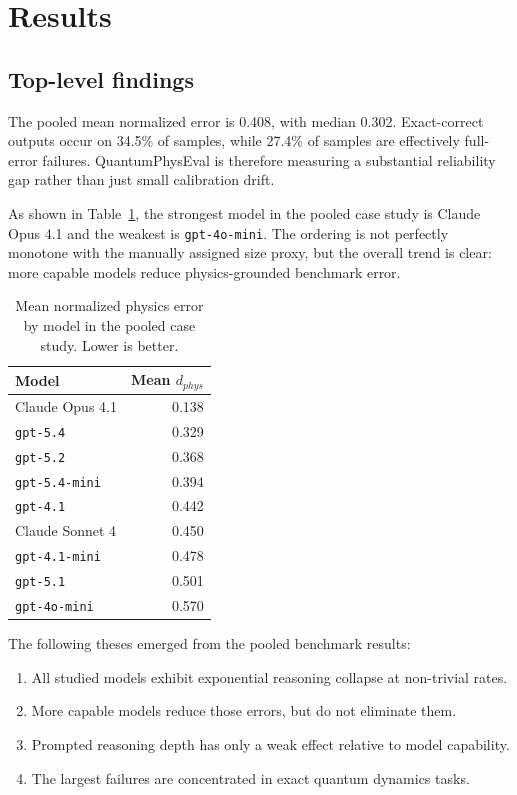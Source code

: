 \documentclass[11pt]{article}
\begin{document}
\section{Results}
\subsection{Top-level findings}
The pooled mean normalized error is 0.408, with median 0.302. Exact-correct outputs occur on 34.5\% of samples, while 27.4\% of samples are effectively full-error failures. QuantumPhysEval is therefore measuring a substantial reliability gap rather than just small calibration drift.

As shown in Table~\ref{tab:model-ranking}, the strongest model in the pooled case study is Claude Opus 4.1 and the weakest is \texttt{gpt-4o-mini}. The ordering is not perfectly monotone with the manually assigned size proxy, but the overall trend is clear: more capable models reduce physics-grounded benchmark error.

\begin{table}[t]
\centering
\caption{Mean normalized physics error by model in the pooled case study. Lower is better.}
\label{tab:model-ranking}
\begin{tabular}{lr}
\toprule
Model & Mean $d_{phys}$ \\
\midrule
Claude Opus 4.1 & 0.138 \\
\texttt{gpt-5.4} & 0.329 \\
\texttt{gpt-5.2} & 0.368 \\
\texttt{gpt-5.4-mini} & 0.394 \\
\texttt{gpt-4.1} & 0.442 \\
Claude Sonnet 4 & 0.450 \\
\texttt{gpt-4.1-mini} & 0.478 \\
\texttt{gpt-5.1} & 0.501 \\
\texttt{gpt-4o-mini} & 0.570 \\
\bottomrule
\end{tabular}
\end{table}

The following theses emerged from the pooled benchmark results:
\begin{enumerate}
\item All studied models exhibit exponential reasoning collapse at non-trivial rates.
\item More capable models reduce those errors, but do not eliminate them.
\item Prompted reasoning depth has only a weak effect relative to model capability.
\item The largest failures are concentrated in exact quantum dynamics tasks.
\end{enumerate}
\end{document}
